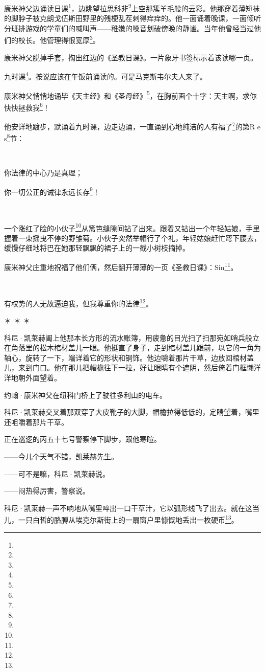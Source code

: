 \par 康米神父边诵读日课\footnote{}，边眺望拉思科非\footnote{}上空那簇羊毛般的云彩。他那穿着薄短袜的脚脖子被克朗戈伍斯田野里的残梗乱茬刺得痒痒的。他一面诵着晚课，一面倾听分班排游戏的学童们的喊叫声——稚嫩的嗓音划破傍晚的静谧。当年他曾经当过他们的校长。他管理得很宽厚\footnote{}。
\par 康米神父脱掉手套，掏出红边的《圣教日课》。一片象牙书签标示着该读哪一页。
\par 九时课\footnote{}。按说应该在午饭前诵读的。可是马克斯韦尔夫人来了。
\par 康米神父悄悄地诵毕《天主经》和《圣母经》\footnote{}，在胸前画个十字：天主啊，求你快快拯救我\footnote{}！
\par 他安详地踱步，默诵着九时课，边走边诵，一直诵到心地纯洁的人有福了\footnote{}的第R e s\footnote{}节：
\par  
\par 你法律的中心乃是真理；
\par 你一切公正的诫律永远长存\footnote{}！
\par  
\par 一个涨红了脸的小伙子\footnote{}从篱笆缝隙间钻了出来。跟着又钻出一个年轻姑娘，手里握着一束摇曳不停的野雏菊。小伙子突然举帽行了个礼，年轻姑娘赶忙弯下腰去，缓慢仔细地将巴在她那轻飘飘的裙子上的一截小树枝摘掉。
\par 康米神父庄重地祝福了他们俩，然后翻开薄薄的一页《圣教日课》：Sin\footnote{}。
\par  
\par 有权势的人无故逼迫我，但我尊重你的法律\footnote{}。
\par ＊ ＊ ＊
\par 科尼·凯莱赫阖上他那本长方形的流水账簿，用疲惫的目光扫了扫那宛如哨兵般立在角落里的松木棺材盖儿一眼。他挺直了身子，走到棺材盖儿跟前，以它的一角为轴心，旋转了一下，端详着它的形状和铜饰。他边嚼着那片干草，边放回棺材盖儿，来到门口。他在那儿把帽檐往下一拉，好让眼睛有个遮阴，然后倚着门框懒洋洋地朝外面望着。
\par 约翰·康米神父在纽科门桥上了驶往多利山的电车。
\par 科尼·凯莱赫交叉着那双穿了大皮靴子的大脚，帽檐拉得低低的，定睛望着，嘴里还咀嚼着那片干草。
\par 正在巡逻的丙五十七号警察停下脚步，跟他寒暄。
\par ——今儿个天气不错，凯莱赫先生。
\par ——可不是嘛，科尼·凯莱赫说。
\par ——闷热得厉害，警察说。
\par 科尼·凯莱赫一声不响地从嘴里啐出一口干草汁，它以弧形线飞了出去。就在这当儿，一只白皙的胳膊从埃克尔斯街上的一扇窗户里慷慨地丢出一枚硬币\footnote{}。
